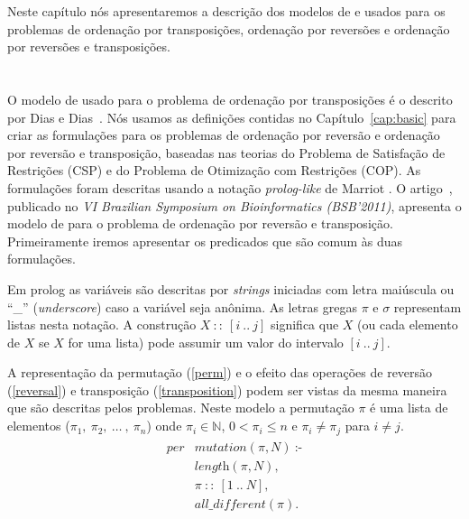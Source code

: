 Neste capítulo nós apresentaremos a descrição dos modelos de \pr{} e
\pli{} usados para os problemas de ordenação por transposições,
ordenação por reversões e ordenação por reversões e transposições.

\section{\PR}
\label{sec:cp}
O modelo de \pr{} usado para o problema de ordenação por transposições
é o descrito por Dias e Dias~\cite{DiasDias*2009}. Nós usamos as
definições contidas no Capítulo~\ref{cap:basic} para criar as
formulações para os problemas de ordenação por reversão e ordenação
por reversão e transposição, baseadas nas teorias do Problema de
Satisfação de Restrições (CSP) e do Problema de Otimização com
Restrições (COP). As formulações foram descritas usando a
notação \textit{prolog-like} de Marriot \cite{Marriott*1998}. O
artigo~\cite{IizukaDias*2011}, publicado no \textit{VI Brazilian
Symposium on Bioinformatics (BSB'2011)}, apresenta o modelo de \pr{}
para o problema de ordenação por reversão e
transposição. Primeiramente iremos apresentar os predicados que são
comum às duas formulações.

Em prolog as variáveis são descritas por \textit{strings} iniciadas
com letra maiúscula ou ``\_'' (\textit{underscore}) caso a variável
seja anônima. As letras gregas $\pi$ e $\sigma$ representam listas
nesta notação. A construção $X~::~[i~..~j]$ significa que $X$ (ou cada
elemento de $X$ se $X$ for uma lista) pode assumir um valor do
intervalo $[i~..~j]$.

A representação da permutação (\ref{perm}) e o efeito das operações de
reversão (\ref{reversal}) e transposição (\ref{transposition}) podem
ser vistas da mesma maneira que são descritas pelos problemas. Neste
modelo a permutação $\pi$ é uma lista de elementos
($\pi_{1},~\pi_{2},~\ldots~,~\pi_{n}$) onde $\pi_{i} \in \mathbb{N}$,
$0 < \pi_{i} \le n$ e $\pi_{i} \neq \pi_{j}$ para $i \neq j$.
\begin{align}
  \label{perm}
  \begin{split}
  \textit{per}&\textit{mutation}(\pi, N)~\text{:-} \\
  &\textit{length}(\pi, N), \\ 
  &\pi~::~[1~..~N], \\
  &\textit{all\_different}(\pi). 
  \end{split}
\end{align}

